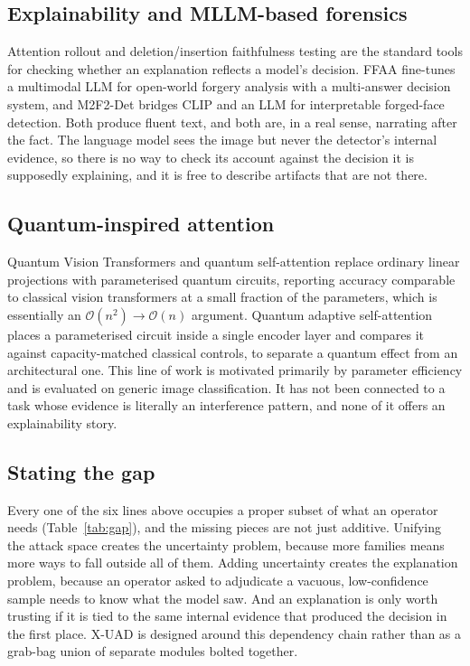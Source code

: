 \documentclass[conference]{IEEEtran}
\begin{document}
\subsection{Explainability and MLLM-based forensics}
Attention rollout \cite{abnar2020rollout} and deletion/insertion faithfulness
testing \cite{petsiuk2018rise} are the standard tools for checking whether an
explanation reflects a model's decision. FFAA \cite{huang2024ffaa}
fine-tunes a multimodal LLM for open-world forgery analysis with a multi-answer
decision system, and M2F2-Det \cite{guo2025m2f2det} bridges CLIP and an LLM for
interpretable forged-face detection. Both produce fluent text, and both are, in a
real sense, narrating after the fact. The language model sees the image but never
the detector's internal evidence, so there is no way to check its account against
the decision it is supposedly explaining, and it is free to describe artifacts that
are not there.

\subsection{Quantum-inspired attention}
Quantum Vision Transformers \cite{cherrat2024qvt} and quantum self-attention
\cite{comajoan2024qgluon,evans2025on} replace ordinary linear projections with
parameterised quantum circuits, reporting accuracy comparable to classical vision
transformers at a small fraction of the parameters, which is essentially an
$\mathcal{O}(n^{2})\to\mathcal{O}(n)$ argument. Quantum adaptive self-attention
\cite{chen2025qasa} places a parameterised circuit inside a single encoder layer
and compares it against capacity-matched classical controls, to separate a quantum
effect from an architectural one. This line of work is motivated
primarily by parameter efficiency and is evaluated on generic image classification.
It has not been connected to a task whose evidence is literally an interference
pattern, and none of it offers an explainability story.

\subsection{Stating the gap}
Every one of the six lines above occupies a proper subset of what an operator
needs (Table~\ref{tab:gap}), and the missing pieces are not just
additive. Unifying the attack space creates the uncertainty problem, because more
families means more ways to fall outside all of them. Adding uncertainty creates the
explanation problem, because an operator asked to adjudicate a vacuous,
low-confidence sample needs to know what the model saw. And an explanation
is only worth trusting if it is tied to the same internal evidence that produced the
decision in the first place. X-UAD is designed around this dependency chain rather
than as a grab-bag union of separate modules bolted together.
\end{document}
